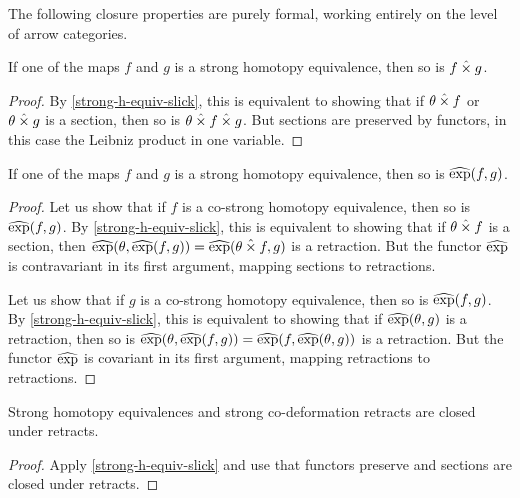 \documentclass[reqno,10pt,a4paper,oneside]{amsart}
\begin{document}
The following closure properties are purely formal, working entirely on the level of arrow categories.

\begin{proposition}
\label{strong-h-equiv-closed-under-prod}
If one of the maps $f$ and $g$ is a strong homotopy equivalence, then so is $f \mathbin{\hat{\times}} g$.
\end{proposition}

\begin{proof}
By \cref{strong-h-equiv-slick}, this is equivalent to showing that if $\theta \mathbin{\hat{\times}} f$ or $\theta \mathbin{\hat{\times}} g$ is a section, then so is $\theta \mathbin{\hat{\times}} f \mathbin{\hat{\times}} g$.
But sections are preserved by functors, in this case the Leibniz product in one variable.
\end{proof}

\begin{proposition}
\label{strong-h-equiv-closed-under-exp}
If one of the maps $f$ and $g$ is a strong homotopy equivalence, then so is $\operatorname{\widehat{exp}}(f, g)$.
\end{proposition}

\begin{proof}
Let us show that if $f$ is a co-strong homotopy equivalence, then so is $\operatorname{\widehat{exp}}(f, g)$.
By \cref{strong-h-equiv-slick}, this is equivalent to showing that if $\theta \mathbin{\hat{\times}} f$ is a section, then $\operatorname{\widehat{exp}}(\theta, \operatorname{\widehat{exp}}(f, g)) = \operatorname{\widehat{exp}}(\theta \mathbin{\hat{\times}} f, g)$ is a retraction.
But the functor $\operatorname{\widehat{exp}}$ is contravariant in its first argument, mapping sections to retractions.

Let us show that if $g$ is a co-strong homotopy equivalence, then so is $\operatorname{\widehat{exp}}(f, g)$.
By \cref{strong-h-equiv-slick}, this is equivalent to showing that if $\operatorname{\widehat{exp}}(\theta, g)$ is a retraction, then so is $\operatorname{\widehat{exp}}(\theta, \operatorname{\widehat{exp}}(f, g)) = \operatorname{\widehat{exp}}(f, \operatorname{\widehat{exp}}(\theta, g))$ is a retraction.
But the functor $\operatorname{\widehat{exp}}$ is covariant in its first argument, mapping retractions to retractions.
\end{proof}

\begin{proposition}
\label{strong-h-equiv-closed-under-retract}
Strong homotopy equivalences and strong co-deformation retracts are closed under retracts.
\end{proposition}

\begin{proof}
Apply \cref{strong-h-equiv-slick} and use that functors preserve and sections are closed under retracts.
\end{proof}
\end{document}
